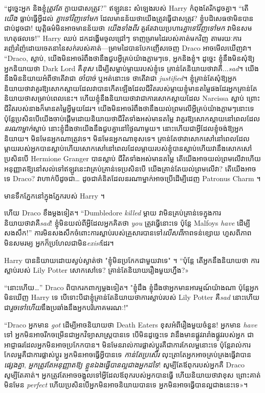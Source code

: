 {{{{{{{“ដូច្នេះអ្នក និងខ្ញុំ\emph{ត្រូវតែ} ក្លាយជាសត្រូវ?” ឥឡូវ​នេះ សំឡេង​របស់ Harry កំពុង​តែ​រីក​ដូច​គ្នា។ “តើ \emph{យើង} ធ្លាប់ធ្វើអ្វីដល់ \emph{គ្នាទៅវិញទៅមក} ដែលមានន័យថាយើងត្រូវធ្វើជាសត្រូវ? ខ្ញុំ​បដិសេធ​ថា​មិន​បាន​ជាប់​ដូច​ជា​! យុត្តិធម៌មិនអាចមានន័យថា \emph{យើងទាំងពីរ} គួរតែវាយប្រហារ\emph{គ្នាទៅវិញទៅមក} វាមិនសមហេតុផលទេ!” Harry ឈប់ ដកដង្ហើមចូលជ្រៅៗ ទាញម្រាមដៃរបស់គាត់មកវិញ តាមរយៈការរញ៉េរញ៉ៃដោយចេតនានៃសក់របស់គាត់—ម្រាមដៃបានបែកញើសចេញ Draco អាចមើលឃើញវា។ “Draco, ស្តាប់, យើងមិនអាចរំពឹងថានឹងជួបអ្វីគ្រប់យ៉ាងភ្លាមៗទេ, អ្នកនិងខ្ញុំ\@ ។ ដូច្នេះ ខ្ញុំនឹងមិនសុំឱ្យអ្នកនិយាយថា Dark Lord គឺ\emph{ខុស} ដើម្បីសម្លាប់ម្តាយរបស់ខ្ញុំទេ គ្រាន់តែនិយាយថាវាគឺ...\emph{sad}។ យើងនឹងមិននិយាយអំពីថាតើវាជា \emph{ចាំបាច់} ឬអត់នោះទេ ថាតើវាជា \emph{justified}។ ខ្ញុំគ្រាន់តែសុំឱ្យអ្នកនិយាយថាវាគួរឱ្យសោកស្តាយដែលវាបានកើតឡើងដែលជីវិតរបស់ម្តាយខ្ញុំមានតម្លៃផងដែរអ្នកគ្រាន់តែនិយាយថាសម្រាប់ពេលនេះ។ ហើយ​ខ្ញុំ​នឹង​និយាយ​ថា​វា​ជា​ការ​សោកស្ដាយ​ដែល Narcissa ស្លាប់ ព្រោះ​ជីវិត​របស់​នាង​ក៏​មាន​តម្លៃ​អ្វី​មួយ​ដែរ។ យើងមិនអាចរំពឹងថានឹងយល់ព្រមលើអ្វីគ្រប់យ៉ាងភ្លាមៗនោះទេ ប៉ុន្តែប្រសិនបើយើងចាប់ផ្តើមដោយនិយាយថាជីវិតទាំងអស់មានតម្លៃ វាគួរឱ្យសោកស្ដាយនៅពេលដែល\emph{នរណាម្នាក់}ស្លាប់ នោះខ្ញុំដឹងថាយើងនឹងជួបគ្នានៅថ្ងៃណាមួយ។ នោះហើយជាអ្វីដែលខ្ញុំចង់ឱ្យអ្នកនិយាយ។ មិនមែនអ្នកណាត្រូវទេ។ មិនមែនអ្នកណាខុសទេ។ គ្រាន់តែថាវាសោកសៅនៅពេលដែលម្តាយរបស់អ្នកបានស្លាប់ហើយសោកសៅនៅពេលដែលម្តាយរបស់ខ្ញុំបានស្លាប់ហើយវានឹងសោកសៅប្រសិនបើ Hermione Granger បានស្លាប់ ជីវិតទាំងអស់មានតម្លៃ តើយើងអាចយល់ព្រមលើវាហើយអនុញ្ញាតឱ្យនៅសល់ទៅឥឡូវនេះវាគ្រប់គ្រាន់ទេប្រសិនបើ យើងគ្រាន់តែយល់ព្រមលើវា? តើយើងអាចទេ Draco? វាហាក់បីដូចជា… ដូចជាគំនិតដែលនរណាម្នាក់អាចប្រើដើម្បីដេញ Patronus Charm ។

មានទឹកភ្នែកនៅក្នុងភ្នែករបស់ Harry ។

ហើយ Draco ខឹងម្តងទៀត។ “Dumbledore \emph{killed} ម្តាយ វាមិនគ្រប់គ្រាន់ទេក្នុងការនិយាយថាវាគឺ\emph{sad}! ខ្ញុំមិនយល់ពីអ្វីដែលអ្នកគិតថា \emph{you} ត្រូវធ្វើនោះទេ ប៉ុន្តែ Malfoys \emph{have} ដើម្បីសងសឹក!” ការមិនសងសឹកចំពោះការស្លាប់របស់គ្រួសារបានទៅ\emph{លើសពី}ភាពទន់ខ្សោយ ហួសពីភាពមិនសមរម្យ អ្នកក៏ប្រហែលជាមិន\emph{exist}ដែរ។

Harry បាននិយាយដោយស្ងប់ស្ងាត់ថា "ខ្ញុំមិនប្រកែកជាមួយវាទេ" ។ “ប៉ុន្តែ តើអ្នកនឹងនិយាយថា ការស្លាប់របស់ Lily Potter សោកសៅទេ? គ្រាន់តែនិយាយរឿងមួយហ្នឹង?»

“នោះហើយ…” Draco ពិបាករកពាក្យម្តងទៀត។ "ខ្ញុំដឹង ខ្ញុំដឹងថាអ្នកមានអារម្មណ៍យ៉ាងណា ប៉ុន្តែអ្នកមិនឃើញ Harry ទេ បើទោះបីជាខ្ញុំគ្រាន់តែនិយាយថាការស្លាប់របស់ Lily Potter គឺ\emph{sad} នោះហើយជា\emph{រួចទៅហើយ}នឹងប្រឆាំងនឹងអ្នកបរិភោគមរណៈ!"

“Draco អ្នកមាន \emph{got} ដើម្បីអាចនិយាយថា Death Eaters ខុសអំពីរឿងមួយចំនួន! អ្នកមាន \emph{have} ទៅ អ្នកមិនអាចរីកចម្រើនជាអ្នកវិទ្យាសាស្ត្របានទេ បើមិនដូច្នេះទេ វានឹងមានផ្លូវរារាំងផ្លូវរបស់អ្នក ជាអាជ្ញាធរដែលអ្នកមិនអាចប្រកែកបាន។ មិនមែនរាល់ការផ្លាស់ប្តូរគឺជាការកែលម្អនោះទេ ប៉ុន្តែរាល់ការកែលម្អគឺជាការផ្លាស់ប្តូរ អ្នកមិនអាចធ្វើអ្វីបានទេ \emph{កាន់តែប្រសើរ} លុះត្រាតែអ្នកអាចគ្រប់គ្រងធ្វើវាបាន \emph{ផ្សេងគ្នា}, \emph{អ្នកត្រូវតែអនុញ្ញាតឱ្យ ខ្លួនឯងធ្វើបានល្អជាងអ្នកដទៃ}! សូម្បីតែឪពុករបស់អ្នកគឺ Draco សូម្បីតែគាត់។ អ្នក​ត្រូវ​តែ​អាច​ចង្អុល​ទៅ​អ្វី​ដែល​ឪពុក​របស់​អ្នក​បាន​ធ្វើ ហើយ​និយាយ​ថា​វា​ខុស ព្រោះ​គាត់​មិន​មែន \emph{perfect} ហើយ​ប្រសិន​បើ​អ្នក​មិន​អាច​និយាយ​បាន​ទេ អ្នក​មិន​អាច​ធ្វើ​បាន​ល្អ​ជាង​នេះ​ទេ»។

}}}}}}}
